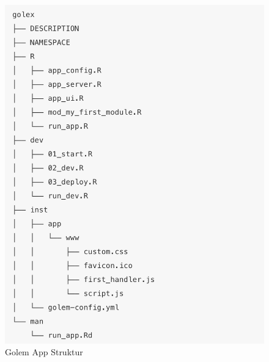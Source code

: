 \begin{figure}
 \centering
 \includegraphics[scale=.4]{"images/02_Aufbau_und_Organisation/golem_app_structure.png"}
 \caption{Golem App Struktur}
\end{figure}

